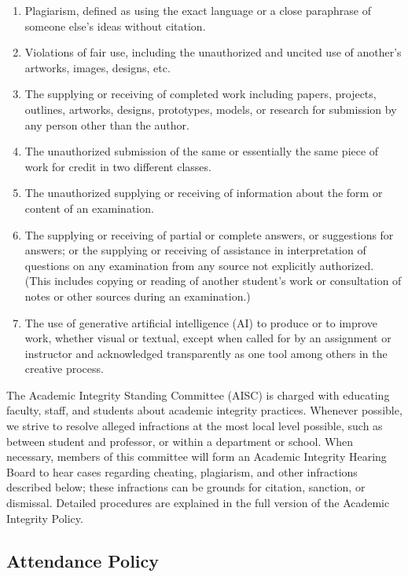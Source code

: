\documentclass[12pt]{article}
\begin{document}
\begin{enumerate}
\item Plagiarism, defined as using the exact language or a close
paraphrase of someone else’s ideas without citation.

\item Violations of fair use, including the unauthorized and uncited use
of another’s artworks, images, designs, etc.

\item The supplying or receiving of completed work including papers,
projects, outlines, artworks, designs, prototypes, models, or
research for submission by any
 person other than the author.
\item The unauthorized submission of the same or essentially the same
piece of work for credit in two different classes.

\item The unauthorized supplying or receiving of information about the
form or content of an examination.

\item The supplying or receiving of partial or complete answers, or
suggestions for answers; or the supplying or receiving of
assistance in interpretation of questions on any examination from
any source not explicitly authorized. (This includes copying or
reading of another student’s work or consultation of notes or other
sources during an examination.)

\item The use of generative artificial intelligence (AI) to produce or to
improve work, whether visual or textual, except when called for by
an assignment or instructor and acknowledged transparently as one
tool among others in the creative process.
\end{enumerate}

The Academic Integrity Standing Committee (AISC) is charged with
educating faculty, staff, and students about academic integrity
practices. Whenever possible, we strive to resolve alleged infractions
at the most local level possible, such as between student and
professor, or within a department or school. When necessary, members
of this committee will form an Academic Integrity Hearing Board to
hear cases regarding cheating, plagiarism, and other infractions
described below; these infractions can be grounds for citation,
sanction, or dismissal. Detailed procedures are explained in the full
version of the Academic Integrity Policy.

\subsection*{Attendance Policy}
\label{sec:orgf120c27}
\end{document}
